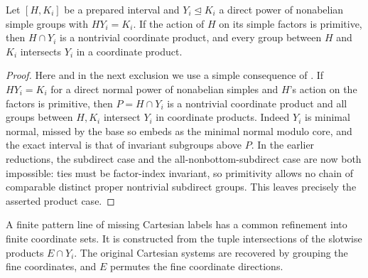 \begin{lemma}\label{c:primitive-product-interval}
Let \([H,K_i]\) be a prepared interval and \(Y_i\trianglelefteq K_i\) a direct power of nonabelian simple groups with \(HY_i=K_i\). If the action of \(H\) on its simple factors is primitive, then \(H\cap Y_i\) is a nontrivial coordinate product, and every group between \(H\) and \(K_i\) intersects \(Y_i\) in a coordinate product.
\end{lemma}

\begin{proof}
Here and in the next exclusion we use a simple consequence of . If \(HY_i=K_i\) for a direct normal power of nonabelian simples and \(H\)'s action on the factors is primitive, then \(P=H\cap Y_i\) is a nontrivial coordinate product and all groups between \(H,K_i\) intersect \(Y_i\) in coordinate products. Indeed \(Y_i\) is minimal normal, missed by the base so embeds as the minimal normal modulo core, and the exact interval is that of invariant subgroups above \(P\). In the earlier reductions, the subdirect case and the all-nonbottom-subdirect case are now both impossible: ties must be factor-index invariant, so primitivity allows no chain of comparable distinct proper nontrivial subdirect groups. This leaves precisely the asserted product case.
\end{proof}

\begin{lemma}\label{c:cartesian-refinement}
A finite pattern line of missing Cartesian labels has a common refinement into finite coordinate sets. It is constructed from the tuple intersections of the slotwise products \(E\cap Y_i\). The original Cartesian systems are recovered by grouping the fine coordinates, and \(E\) permutes the fine coordinate directions.
\end{lemma}

